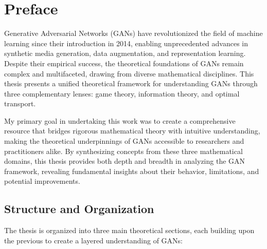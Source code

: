 \section{Preface}

Generative Adversarial Networks (GANs) have revolutionized the field of machine learning since their introduction in 2014, enabling unprecedented advances in synthetic media generation, data augmentation, and representation learning. Despite their empirical success, the theoretical foundations of GANs remain complex and multifaceted, drawing from diverse mathematical disciplines. This thesis presents a unified theoretical framework for understanding GANs through three complementary lenses: game theory, information theory, and optimal transport.

My primary goal in undertaking this work was to create a comprehensive resource that bridges rigorous mathematical theory with intuitive understanding, making the theoretical underpinnings of GANs accessible to researchers and practitioners alike. By synthesizing concepts from these three mathematical domains, this thesis provides both depth and breadth in analyzing the GAN framework, revealing fundamental insights about their behavior, limitations, and potential improvements.

\subsection*{Structure and Organization}

The thesis is organized into three main theoretical sections, each building upon the previous to create a layered understanding of GANs:

